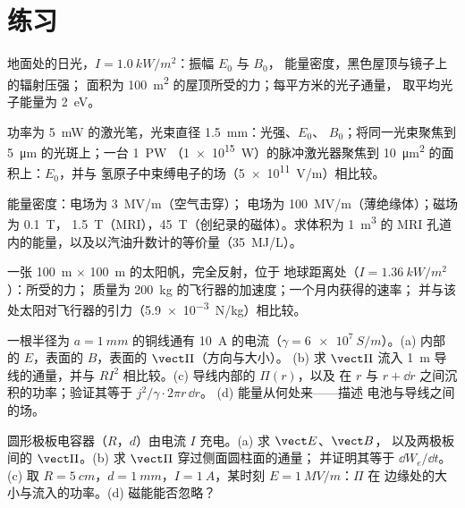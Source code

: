 \section{练习}

\begin{exercise}[$\star$]\label{exo:b2:poynting-vector:1}
地面处的日光，$I = \qty{1.0}{kW/m^2}$：振幅 $E_0$ 与 $B_0$，
能量密度，黑色屋顶与镜子上的辐射压强；
面积为 \qty{100}{m^2} 的屋顶所受的力；每平方米的光子通量，
取平均光子能量为 \qty{2}{eV}。
\end{exercise}

\begin{exercise}[$\star$]\label{exo:b2:poynting-vector:2}
功率为 \qty{5}{mW} 的激光笔，光束直径 \qty{1.5}{mm}：光强、$E_0$、
$B_0$；将同一光束聚焦到 \qty{5}{\micro m} 的光斑上；一台 \qty{1}{PW}
（\qty{1e15}{W}）的脉冲激光器聚焦到 \qty{10}{\micro m^2} 的面积上：$E_0$，并与
氢原子中束缚电子的场（\qty{5e11}{V/m}）相比较。
\end{exercise}

\begin{exercise}[$\star$]\label{exo:b2:poynting-vector:3}
能量密度：电场为 \qty{3}{MV/m}（空气击穿）；
电场为 \qty{100}{MV/m}（薄绝缘体）；磁场为 \qty{0.1}{T}，
\qty{1.5}{T}（MRI），\qty{45}{T}（创纪录的磁体）。求体积为 \qty{1}{m^3} 的 MRI
孔道内的能量，以及以汽油升数计的等价量（\qty{35}{MJ/L}）。
\end{exercise}

\begin{exercise}[$\star$]\label{exo:b2:poynting-vector:4}
一张 \qty{100}{m} $\times$ \qty{100}{m} 的太阳帆，完全反射，位于
地球距离处（$I = \qty{1.36}{kW/m^2}$）：所受的力；
质量为 \qty{200}{kg} 的飞行器的加速度；一个月内获得的速率；
并与该处太阳对飞行器的引力（\qty{5.9e-3}{N/kg}）相比较。
\end{exercise}

\begin{exercise}[$\star\star$]\label{exo:b2:poynting-vector:5}
一根半径为 $a = \qty{1}{mm}$ 的铜线通有 \qty{10}{A} 的电流（$\gamma =
\qty{6e7}{S/m}$）。(a) 内部的 $E$，表面的 $B$，表面的 $\vect\Pi$（方向与大小）。
(b) 求 $\vect\Pi$ 流入 \qty{1}{m}
导线的通量，并与 $RI^2$ 相比较。(c) 导线内部的 $\Pi(r)$，以及
在 $r$ 与 $r + \dd r$ 之间沉积的功率；验证其等于 $j^2/\gamma\cdot2\pi r\,\dd r$。
(d) 能量从何处来——描述
电池与导线之间的场。
\end{exercise}

\begin{exercise}[$\star\star$]\label{exo:b2:poynting-vector:6}
圆形极板电容器（$R$，$d$）由电流 $I$ 充电。(a) 求 $\vect E$、$\vect B$，
以及两极板间的 $\vect\Pi$。(b) 求 $\vect\Pi$ 穿过侧面圆柱面的通量；
并证明其等于 $\dd W_e/\dd t$。(c) 取 $R = \qty{5}{cm}$，$d =
\qty{1}{mm}$，$I = \qty{1}{A}$，某时刻 $E = \qty{1}{MV/m}$：$\Pi$ 在
边缘处的大小与流入的功率。(d) 磁能能否忽略？
\end{exercise}

